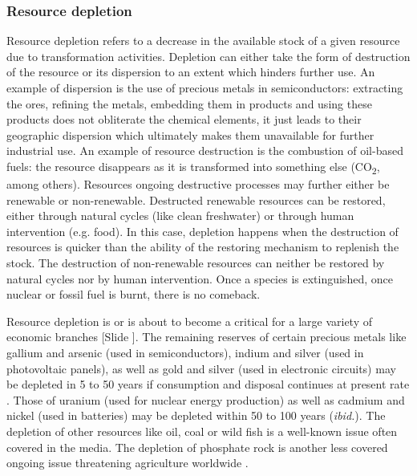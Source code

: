 \documentclass{article}
\newcounter{slide}
\begin{document}
\subsubsection{Resource depletion}
\label{sec:depletion}
Resource depletion refers to a decrease in the available stock of a given resource due to transformation activities. Depletion can either take the form of destruction of the resource or its dispersion to an extent which hinders further use. An example of dispersion is the use of precious metals in semiconductors: extracting the ores, refining the metals, embedding them in products and using these products does not obliterate the chemical elements, it just leads to their geographic dispersion which ultimately makes them unavailable for further industrial use. An example of resource destruction is the combustion of oil-based fuels: the resource disappears as it is transformed into something else (CO\textsubscript{2}, among others). Resources ongoing destructive processes may further either be renewable or non-renewable. Destructed renewable resources can be restored, either through natural cycles (like clean freshwater) or through human intervention (e.g. food). In this case, depletion happens when the destruction of resources is quicker than the ability of the restoring mechanism to replenish the stock. The destruction of non-renewable resources can neither be restored by natural cycles nor by human intervention. Once a species is extinguished, once nuclear or fossil fuel is burnt, there is no comeback.

Resource depletion is or is about to become a critical for a large variety of economic branches {\color{blue}[Slide ]}. The remaining reserves of certain precious metals like gallium and arsenic (used in semiconductors), indium and silver (used in photovoltaic panels), as well as gold and silver (used in electronic circuits) may be depleted in 5 to 50 years if consumption and disposal continues at present rate \cite{dodsonElementalSustainabilityTotal2012}. Those of uranium (used for nuclear energy production) as well as cadmium and nickel (used in batteries) may be depleted within 50 to 100 years (\emph{ibid.}). The depletion of other resources like oil, coal or wild fish is a well-known issue often covered in the media. The depletion of phosphate rock is another less covered ongoing issue threatening agriculture worldwide \cite{cooperFutureDistributionProduction2011}.
\end{document}
